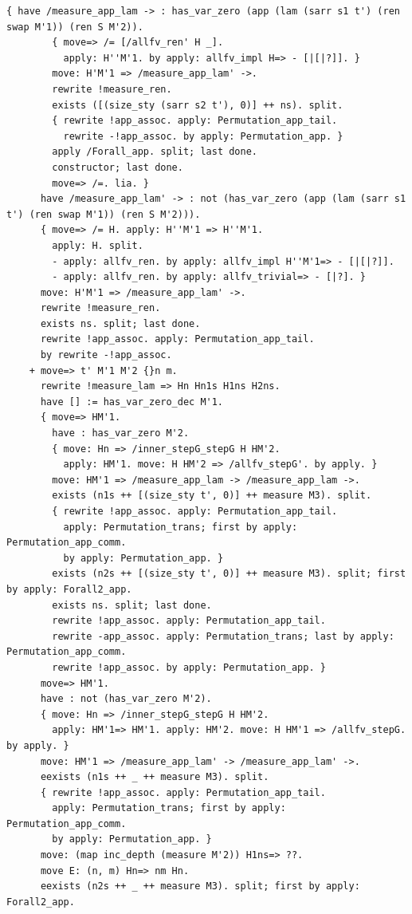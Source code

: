 \begin{lstlisting}[style=authorcoq]
      { have /measure_app_lam -> : has_var_zero (app (lam (sarr s1 t') (ren swap M'1)) (ren S M'2)).
        { move=> /= [/allfv_ren' H _].
          apply: H''M'1. by apply: allfv_impl H=> - [|[|?]]. }
        move: H'M'1 => /measure_app_lam' ->.
        rewrite !measure_ren.
        exists ([(size_sty (sarr s2 t'), 0)] ++ ns). split.
        { rewrite !app_assoc. apply: Permutation_app_tail.
          rewrite -!app_assoc. by apply: Permutation_app. }
        apply /Forall_app. split; last done.
        constructor; last done.
        move=> /=. lia. }
      have /measure_app_lam' -> : not (has_var_zero (app (lam (sarr s1 t') (ren swap M'1)) (ren S M'2))).
      { move=> /= H. apply: H''M'1 => H''M'1.
        apply: H. split.
        - apply: allfv_ren. by apply: allfv_impl H''M'1=> - [|[|?]].
        - apply: allfv_ren. by apply: allfv_trivial=> - [|?]. }
      move: H'M'1 => /measure_app_lam' ->.
      rewrite !measure_ren.
      exists ns. split; last done.
      rewrite !app_assoc. apply: Permutation_app_tail.
      by rewrite -!app_assoc.
    + move=> t' M'1 M'2 {}n m.
      rewrite !measure_lam => Hn Hn1s H1ns H2ns.
      have [] := has_var_zero_dec M'1.
      { move=> HM'1.
        have : has_var_zero M'2.
        { move: Hn => /inner_stepG_stepG H HM'2.
          apply: HM'1. move: H HM'2 => /allfv_stepG'. by apply. }
        move: HM'1 => /measure_app_lam -> /measure_app_lam ->.
        exists (n1s ++ [(size_sty t', 0)] ++ measure M3). split.
        { rewrite !app_assoc. apply: Permutation_app_tail.
          apply: Permutation_trans; first by apply: Permutation_app_comm.
          by apply: Permutation_app. }
        exists (n2s ++ [(size_sty t', 0)] ++ measure M3). split; first by apply: Forall2_app.
        exists ns. split; last done.
        rewrite !app_assoc. apply: Permutation_app_tail.
        rewrite -app_assoc. apply: Permutation_trans; last by apply: Permutation_app_comm.
        rewrite !app_assoc. by apply: Permutation_app. }
      move=> HM'1.
      have : not (has_var_zero M'2).
      { move: Hn => /inner_stepG_stepG H HM'2.
        apply: HM'1=> HM'1. apply: HM'2. move: H HM'1 => /allfv_stepG. by apply. }
      move: HM'1 => /measure_app_lam' -> /measure_app_lam' ->.
      eexists (n1s ++ _ ++ measure M3). split.
      { rewrite !app_assoc. apply: Permutation_app_tail.
        apply: Permutation_trans; first by apply: Permutation_app_comm.
        by apply: Permutation_app. }
      move: (map inc_depth (measure M'2)) H1ns=> ??.
      move E: (n, m) Hn=> nm Hn.
      eexists (n2s ++ _ ++ measure M3). split; first by apply: Forall2_app.

\end{lstlisting}
